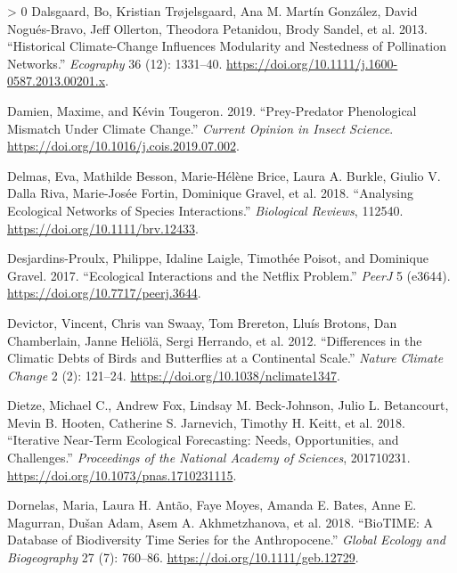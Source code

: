 \documentclass[10pt,oneside]{article}
\newlength{\cslhangindent}
\newenvironment{CSLReferences}[3] %
 {%
  \setlength{\parindent}{0pt}
  \ifodd #1 \everypar{\setlength{\hangindent}{\cslhangindent}}\ignorespaces\fi
  \ifnum #2 > 0
  \setlength{\parskip}{#2\baselineskip}
  \fi
 }%
 {}
\begin{document}
\begin{CSLReferences}{1}{0}
\leavevmode\hypertarget{ref-Dalsgaard2013HisCli}{}%
Dalsgaard, Bo, Kristian Trøjelsgaard, Ana M. Martín González, David
Nogués-Bravo, Jeff Ollerton, Theodora Petanidou, Brody Sandel, et al.
2013. {``Historical Climate-Change Influences Modularity and Nestedness
of Pollination Networks.''} \emph{Ecography} 36 (12): 1331--40.
\url{https://doi.org/10.1111/j.1600-0587.2013.00201.x}.

\leavevmode\hypertarget{ref-Damien2019PrePhe}{}%
Damien, Maxime, and Kévin Tougeron. 2019. {``Prey-Predator Phenological
Mismatch Under Climate Change.''} \emph{Current Opinion in Insect
Science}. \url{https://doi.org/10.1016/j.cois.2019.07.002}.

\leavevmode\hypertarget{ref-Delmas2018AnaEco}{}%
Delmas, Eva, Mathilde Besson, Marie-Hélène Brice, Laura A. Burkle,
Giulio V. Dalla Riva, Marie-Josée Fortin, Dominique Gravel, et al. 2018.
{``Analysing Ecological Networks of Species Interactions.''}
\emph{Biological Reviews}, 112540.
\url{https://doi.org/10.1111/brv.12433}.

\leavevmode\hypertarget{ref-Desjardins-Proulx2017EcoInt}{}%
Desjardins-Proulx, Philippe, Idaline Laigle, Timothée Poisot, and
Dominique Gravel. 2017. {``Ecological Interactions and the Netflix
Problem.''} \emph{PeerJ} 5 (e3644).
\url{https://doi.org/10.7717/peerj.3644}.

\leavevmode\hypertarget{ref-Devictor2012DifCli}{}%
Devictor, Vincent, Chris van Swaay, Tom Brereton, Lluís Brotons, Dan
Chamberlain, Janne Heliölä, Sergi Herrando, et al. 2012. {``Differences
in the Climatic Debts of Birds and Butterflies at a Continental
Scale.''} \emph{Nature Climate Change} 2 (2): 121--24.
\url{https://doi.org/10.1038/nclimate1347}.

\leavevmode\hypertarget{ref-Dietze2018IteNea}{}%
Dietze, Michael C., Andrew Fox, Lindsay M. Beck-Johnson, Julio L.
Betancourt, Mevin B. Hooten, Catherine S. Jarnevich, Timothy H. Keitt,
et al. 2018. {``Iterative Near-Term Ecological Forecasting: Needs,
Opportunities, and Challenges.''} \emph{Proceedings of the National
Academy of Sciences}, 201710231.
\url{https://doi.org/10.1073/pnas.1710231115}.

\leavevmode\hypertarget{ref-Dornelas2018BioDat}{}%
Dornelas, Maria, Laura H. Antão, Faye Moyes, Amanda E. Bates, Anne E.
Magurran, Dušan Adam, Asem A. Akhmetzhanova, et al. 2018. {``BioTIME: A
Database of Biodiversity Time Series for the Anthropocene.''}
\emph{Global Ecology and Biogeography} 27 (7): 760--86.
\url{https://doi.org/10.1111/geb.12729}.


\end{CSLReferences}
\end{document}
